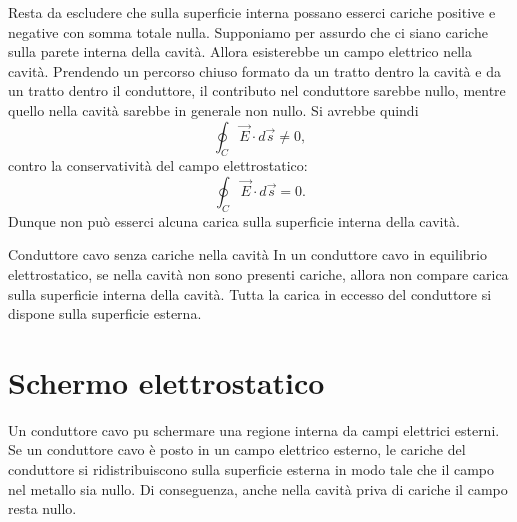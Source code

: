 \documentclass[a4paper]{article}
\begin{document}
\begin{center}
\end{center}

Resta da escludere che sulla superficie interna possano esserci cariche positive e negative con somma totale nulla. Supponiamo per assurdo che ci siano cariche sulla parete interna della cavità. Allora esisterebbe un campo elettrico nella cavità. Prendendo un percorso chiuso formato da un tratto dentro la cavità e da un tratto dentro il conduttore, il contributo nel conduttore sarebbe nullo, mentre quello nella cavità sarebbe in generale non nullo. Si avrebbe quindi
\[
    \oint_C \vec{E}\cdot d\vec{s}\neq 0,
\]
contro la conservatività del campo elettrostatico:
\[
    \oint_C \vec{E}\cdot d\vec{s}=0.
\]
Dunque non può esserci alcuna carica sulla superficie interna della cavità.

\begin{snippettheorem}{Conduttore cavo senza cariche nella cavità}
    In un conduttore cavo in equilibrio elettrostatico, se nella cavità non sono presenti cariche, allora non compare carica sulla superficie interna della cavità. Tutta la carica in eccesso del conduttore si dispone sulla superficie esterna.
\end{snippettheorem}

\section{Schermo elettrostatico}

Un conduttore cavo pu schermare una regione interna da campi elettrici esterni. Se un conduttore cavo è posto in un campo elettrico esterno, le cariche del conduttore si ridistribuiscono sulla superficie esterna in modo tale che il campo nel metallo sia nullo. Di conseguenza, anche nella cavità priva di cariche il campo resta nullo.
\end{document}
